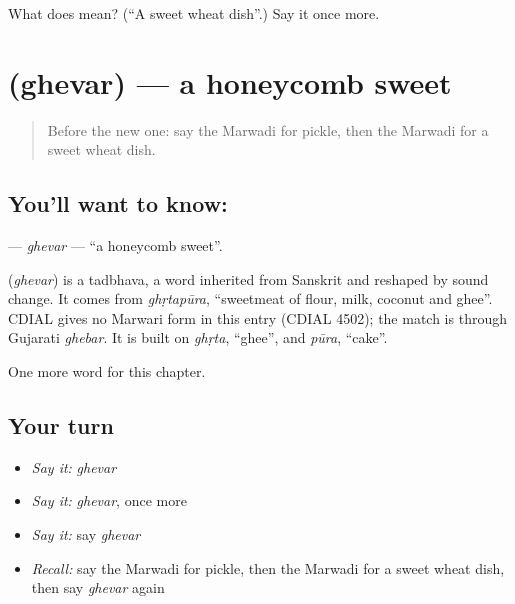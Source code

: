 \begin{tcolorbox}[breakable,colback=teal!4,colframe=teal!35!black,title={Before you move on}]
What does  mean? (\textquotedblleft{}A sweet wheat dish\textquotedblright{}.) Say it once more.
\end{tcolorbox}
\section[\texorpdfstring{\mw{घेवर} (ghevar)}{घेवर (ghevar)}]{ (ghevar) — a honeycomb sweet}

\label{lesson:MW-C132-ghevar}



\begin{quote}
Before the new one: say the Marwadi for pickle, then the Marwadi for a sweet wheat dish.
\end{quote}

\subsection*{You'll want to know: }
\textbf{} — \emph{ghevar} — \textquotedblleft{}a honeycomb sweet\textquotedblright{}.

\begin{cousinweb}
\textbf{} (\emph{ghevar}) is a tadbhava, a word inherited from Sanskrit and reshaped by sound change. It comes from \emph{ghṛtapūra}, \textquotedblleft{}sweetmeat of flour, milk, coconut and ghee\textquotedblright{}. CDIAL gives no Marwari form in this entry (CDIAL 4502); the match is through Gujarati \emph{ghebar}. It is built on \emph{ghṛta}, \textquotedblleft{}ghee\textquotedblright{}, and \emph{pūra}, \textquotedblleft{}cake\textquotedblright{}.
\end{cousinweb}

\begin{grammarlens}[title={What you've built}]
One more word for this chapter.
\end{grammarlens}

\subsection*{Your turn}
\begin{itemize}
\raggedright
  \item \emph{Say it:} \emph{ghevar}
  \item \emph{Say it:} \emph{ghevar}, once more
  \item \emph{Say it:} say \emph{ghevar}
  \item \emph{Recall:} say the Marwadi for pickle, then the Marwadi for a sweet wheat dish, then say \emph{ghevar} again
\end{itemize}

